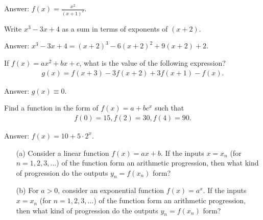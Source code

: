 \begin{solution}[name=Solution by Parviz Shahriari]
Answer: $f(x) = \frac{x^2}{(x+1)^2}$.
\end{solution}



\begin{tcolorbox}
\begin{question}
Write $x^3-3x+4$ as a sum in terms of exponents of $(x+2)$.
\end{question}
\end{tcolorbox}

\begin{solution}[name=Solution by Parviz Shahriari]
Answer: $x^3-3x+4 = (x+2)^3 -6(x+2)^2 + 9(x+2) + 2$.
\end{solution}


\begin{tcolorbox}
\begin{question}
If $f(x)=ax^2+bx+c$, what is the value of the following expression?
\begin{align*}
    g(x) = f(x+3) - 3f(x+2) + 3f(x+1) - f(x).
\end{align*}
\end{question}
\end{tcolorbox}

\begin{solution}[name=Solution by Parviz Shahriari]
Answer: $g(x) \equiv 0$.
\end{solution}

\begin{tcolorbox}
\begin{question}
Find a function in the form of $f(x)=a+bc^x$ such that
\begin{align*}
    f(0)=15, f(2)=30, f(4)=90.
\end{align*}
\end{question}
\end{tcolorbox}

\begin{solution}[name=Solution by Parviz Shahriari]
Answer: $f(x) = 10 + 5 \cdot 2^x$.
\end{solution}

\begin{tcolorbox}
\begin{question}
\begin{itemize}
    \item[(a)] Consider a linear function $f(x)=ax+b$. If the inputs $x=x_n$ (for $n=1,2,3,\dots$) of the function form an arithmetic progression, then what kind of progression do the outputs $y_n=f(x_n)$ form?
    \item[(b)] For $a>0$, consider an exponential function $f(x)=a^x$. If the inputs $x=x_n$ (for $n=1,2,3,\dots$) of the function form an arithmetic progression, then what kind of progression do the outputs $y_n=f(x_n)$ form?
\end{itemize}
\end{question}
\end{tcolorbox}

